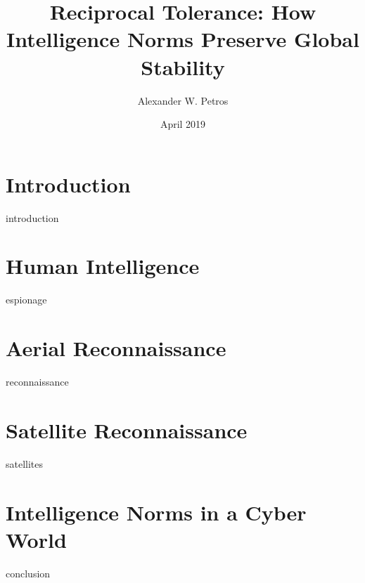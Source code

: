 \documentclass{report}
\title{Reciprocal Tolerance: How Intelligence Norms Preserve Global Stability}
\author{Alexander W. Petros}
\date{April 2019}
\begin{document}
    \maketitle
    \tableofcontents
    \newpage


    \chapter{Introduction}
    {introduction}

    \chapter{Human Intelligence}
    {espionage}

    \chapter{Aerial Reconnaissance}
    {reconnaissance}

    \chapter{Satellite Reconnaissance}
    {satellites}

    \chapter{Intelligence Norms in a Cyber World}
    {conclusion}
\end{document}
